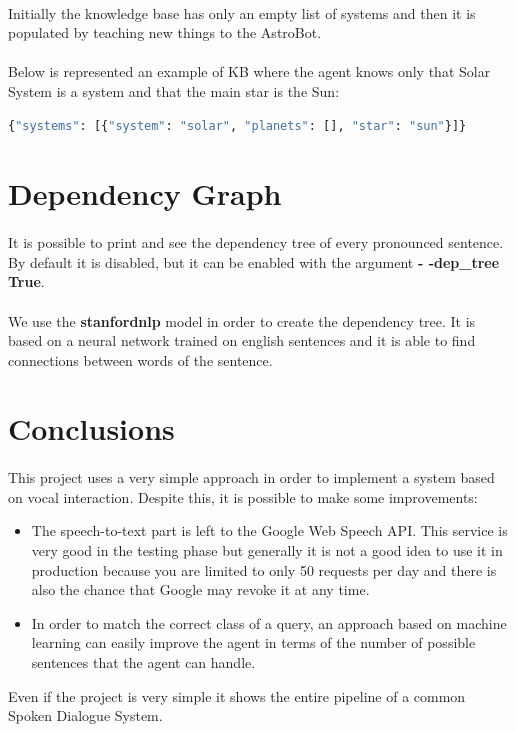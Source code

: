 \documentclass[12pt, a4paper]{article}
\begin{document}
\paragraph{}
Initially the knowledge base has only an empty list of systems and then it is populated by teaching new things to the AstroBot.
\paragraph{}
Below is represented an example of KB where the agent knows only that Solar System is a system and that the main star is the Sun:
\vspace{1em}
\begin{lstlisting}[language=Python]
{"systems": [{"system": "solar", "planets": [], "star": "sun"}]}
\end{lstlisting}
\section{Dependency Graph}
\paragraph{}
It is possible to print and see the dependency tree of every pronounced sentence. By default it is disabled, but it can be enabled with the argument \textbf{- -dep\_tree True}.
\paragraph{}
We use the \textbf{stanfordnlp} model in order to create the dependency tree. It is based on a neural network trained on english sentences and it is able to find connections between words of the sentence.
\section{Conclusions}
\paragraph{}
This project uses a very simple approach in order to implement a system based on vocal interaction.
Despite this, it is possible to make some improvements:
\begin{itemize}
\item The speech-to-text part is left to the Google Web Speech API. This service is very good in the testing phase but generally it is not a good idea to use it in production because you are limited to only 50 requests per day and there is also the chance that Google may revoke it at any time.
\item In order to match the correct class of a query, an approach based on machine learning can easily improve the agent in terms of the number of possible sentences that the agent can handle.
\end{itemize}
Even if the project is very simple it shows the entire pipeline of a common Spoken Dialogue System. 
\end{document}
